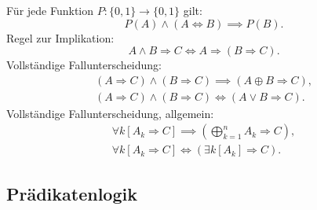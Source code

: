Für jede Funktion $P\colon\{0,1\}\to\{0,1\}$ gilt:
\begin{equation}
P(A)\land (A\Leftrightarrow B)\implies P(B).
\end{equation}
Regel zur Implikation:
\begin{equation}
A\land B\Rightarrow C \iff A\Rightarrow (B\Rightarrow C).
\end{equation}
Vollständige Fallunterscheidung:
\begin{gather}
(A\Rightarrow C)\land (B\Rightarrow C)\implies (A\oplus B\Rightarrow C),\\
(A\Rightarrow C)\land (B\Rightarrow C)\iff (A\lor B\Rightarrow C).
\end{gather}
Vollständige Fallunterscheidung, allgemein:
\begin{gather}
\textstyle \forall k[A_k\Rightarrow C]
\implies (\bigoplus_{k=1}^n A_k\Rightarrow C),\\
\forall k[A_k\Rightarrow C]
\iff (\exists k[A_k]\Rightarrow C).
\end{gather}

\newpage
\subsection{Prädikatenlogik}
